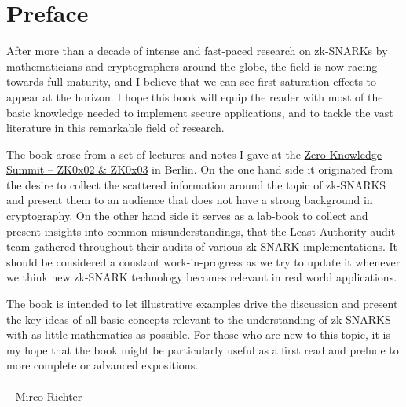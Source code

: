 \chapter*{Preface}
After more than a decade of intense and fast-paced research on zk-SNARKs by mathematicians
and cryptographers around the globe, the field is now racing towards full maturity, and I believe that we can see first saturation effects to appear at the horizon. I hope this book will equip the reader with most of the basic knowledge needed to implement secure applications, and to tackle the vast literature in this remarkable field of research.

The book arose from a set of lectures and notes I gave at the \href{https://www.zksummit.com/}{Zero Knowledge Summit – ZK0x02 \& ZK0x03} in Berlin. On the one hand side it originated from the desire to collect the scattered information around the topic of zk-SNARKS and present them to an audience that does not have a strong background in cryptography. On the other hand side it serves as a lab-book to collect and present insights  into common misunderstandings, that the Least Authority audit team gathered throughout their audits of various zk-SNARK implementations. It should be considered a constant work-in-progress as we try to update it whenever we think new zk-SNARK technology becomes relevant in real world applications. 

The book is intended to let illustrative examples drive the discussion and present the key ideas of all basic concepts relevant to the understanding of zk-SNARKS with as little mathematics as possible. For those who are new to this topic, it is my hope that the book might be particularly useful as a first read and prelude to more complete or advanced expositions.
\\
\\
\hspace*{0pt}\hfill -- Mirco Richter --

